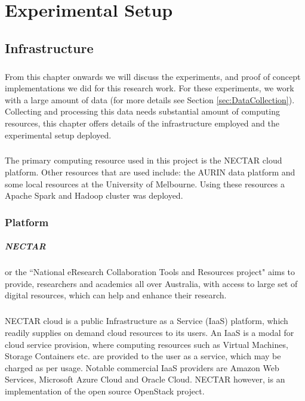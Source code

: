 \documentclass[12pt]{report}
\theoremstyle{named}
\begin{document}
\chapter{Experimental Setup}
\section{Infrastructure}
\paragraph{}
From this chapter onwards we will discuss the experiments, and proof of concept implementations we did for this research work. For these experiments, we work with a large amount of data (for more details see Section \ref{sec:DataCollection}). Collecting and processing this data needs substantial amount of computing resources, this chapter offers details of the infrastructure employed and the experimental setup deployed.
\paragraph{}
The primary computing resource used in this project is the NECTAR\cite{NECTAR} cloud platform. Other resources that are used include: the AURIN\cite{AURIN} data platform and some local resources at the University of Melbourne. Using these resources a Apache Spark and Hadoop cluster was deployed.

\subsection{Platform}
\paragraph{NECTAR} or the ``National eResearch Collaboration Tools and Resources project" aims to provide, researchers and academics all over Australia, with access to large set of digital resources, which can help and enhance their research. 
\paragraph{}
NECTAR cloud is a public Infrastructure as a Service (IaaS) platform, which readily supplies on demand cloud resources to its users. An IaaS is a modal for cloud service provision, where computing resources such as Virtual Machines, Storage Containers etc. are provided to the user as a service, which may be charged as per usage. Notable commercial IaaS providers are Amazon Web Services\cite{AWS}, Microsoft Azure Cloud\cite{Azure} and Oracle Cloud\cite{OracleCloud}. NECTAR however, is an implementation of the open source OpenStack\cite{OpenStack} project.
\end{document}
